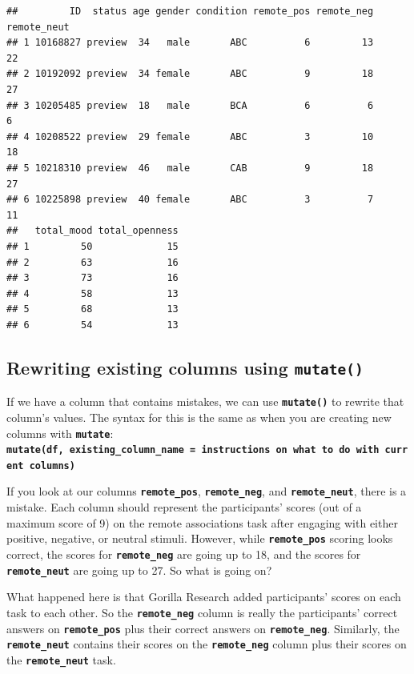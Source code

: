 \documentclass[
]{book}
\begin{document}
\begin{verbatim}
##         ID  status age gender condition remote_pos remote_neg remote_neut
## 1 10168827 preview  34   male       ABC          6         13          22
## 2 10192092 preview  34 female       ABC          9         18          27
## 3 10205485 preview  18   male       BCA          6          6           6
## 4 10208522 preview  29 female       ABC          3         10          18
## 5 10218310 preview  46   male       CAB          9         18          27
## 6 10225898 preview  40 female       ABC          3          7          11
##   total_mood total_openness
## 1         50             15
## 2         63             16
## 3         73             16
## 4         58             13
## 5         68             13
## 6         54             13
\end{verbatim}

\subsection{\texorpdfstring{Rewriting existing columns using \texttt{mutate()}}{Rewriting existing columns using mutate()}}\label{rewriting-existing-columns-using-mutate}

If we have a column that contains mistakes, we can use \textbf{\texttt{mutate()}} to rewrite that column's values. The syntax for this is the same as when you are creating new columns with \textbf{\texttt{mutate}}: \textbf{\texttt{mutate(df,\ existing\_column\_name\ =\ instructions\ on\ what\ to\ do\ with\ current\ columns)}}

If you look at our columns \textbf{\texttt{remote\_pos}}, \textbf{\texttt{remote\_neg}}, and \textbf{\texttt{remote\_neut}}, there is a mistake. Each column should represent the participants' scores (out of a maximum score of 9) on the remote associations task after engaging with either positive, negative, or neutral stimuli. However, while \textbf{\texttt{remote\_pos}} scoring looks correct, the scores for \textbf{\texttt{remote\_neg}} are going up to 18, and the scores for \textbf{\texttt{remote\_neut}} are going up to 27. So what is going on?

What happened here is that Gorilla Research added participants' scores on each task to each other. So the \textbf{\texttt{remote\_neg}} column is really the participants' correct answers on \textbf{\texttt{remote\_pos}} plus their correct answers on \textbf{\texttt{remote\_neg}}. Similarly, the \textbf{\texttt{remote\_neut}} contains their scores on the \textbf{\texttt{remote\_neg}} column plus their scores on the \textbf{\texttt{remote\_neut}} task.
\end{document}
